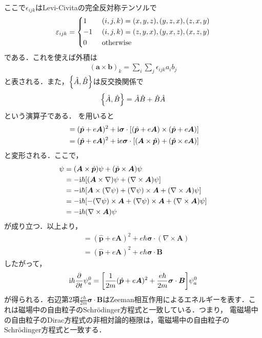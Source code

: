 \documentclass{report}
\begin{document}
ここで$\epsilon_{ijk}$はLevi-Civitaの完全反対称テンソルで
\begin{align}
  \epsilon_{ijk} = 
  \begin{dcases}
    1\ &(i,j,k) = (x,y,z),(y,z,x),(z,x,y)\\
    -1\ &(i,j,k) = (z,y,x),(y,x,z),(x,z,y)\\
    0\ &\text{otherwise}
  \end{dcases}
\end{align}
である．これを使えば外積は
\begin{align}
  (\bm{a} \times \bm{b})_k = \sum_{i} \sum_{j} \epsilon_{ijk} a_i b_j
\end{align}
と表される．また，$\qty{\hat{A},\hat{B}}$は反交換関係で
\begin{align}
  \qty{\hat{A},\hat{B}} = \hat{A}\hat{B} + \hat{B}\hat{A}
\end{align}
という演算子である．
を用いると
\begin{align}
  [\bm{\sigma}\cdot(\bm{p} + e\bm{A})][\bm{\sigma}\cdot(\bm{p} + e\bm{A})] &= (\hat{\bm{p}} + e\bm{A})^2 + \i \bm{\sigma} \cdot [(\hat{\bm{p}} + e\bm{A}) \times (\hat{\bm{p}} + e\bm{A})]\\
  &= (\hat{\bm{p}} + e\bm{A})^2 + \i e \bm{\sigma} \cdot [(\bm{A} \times \hat{\bm{p}}) + (\hat{\bm{p}} \times e\bm{A})]\\
\end{align}
と変形される．ここで，
\begin{align}
  [(\bm{A} \times \hat{\bm{p}}) + (\hat{\bm{p}} \times e\bm{A})]\psi &= (\bm{A} \times \hat{\bm{p}})\psi + (\hat{\bm{p}} \times \bm{A})\psi\\
  &= -\i \hbar \qty[(\bm{A} \times \nabla) \psi + (\nabla \times \bm{A}) \psi]\\
  &= -\i\hbar \qty[\bm{A} \times (\nabla \psi) + (\nabla\psi)\times \bm{A} + (\nabla \times \bm{A}) \psi]\\
  &= -\i\hbar \qty[-(\nabla\psi)\times \bm{A} + (\nabla\psi)\times \bm{A} + (\nabla \times \bm{A}) \psi]\\
  &= -\i\hbar(\nabla \times \bm{A}) \psi
\end{align}
が成り立つ．以上より，
\begin{align}
  [\bm{\sigma}\cdot(\bm{p} + e\bm{A})][\bm{\sigma}\cdot(\bm{p} + e\bm{A})] &= (\hat{\bm{p}} + e\bm{A})^2 + e\hbar \bm{\sigma}\cdot(\nabla \times \bm{A})\\
  &= (\hat{\bm{p}} + e\bm{A})^2 + e\hbar \bm{\sigma} \cdot \bm{B}
\end{align}
したがって，
\begin{align}
  \i\hbar \frac{\partial}{\partial t} \psi_a^0 = \qty[\frac{1}{2m} (\hat{\bm{p}} + e\bm{A})^2 + \frac{e\hbar}{2m}\bm{\sigma}\cdot\bm{B}] \psi_a^0
\end{align}
が得られる．右辺第2項$\frac{e\hbar}{2m}\bm{\sigma}\cdot\bm{B}$はZeeman相互作用によるエネルギーを表す．これは磁場中の自由粒子のSchrödinger方程式と一致している．つまり，
電磁場中の自由粒子のDirac方程式の非相対論的極限は，電磁場中の自由粒子のSchrödinger方程式と一致する．
\end{document}
